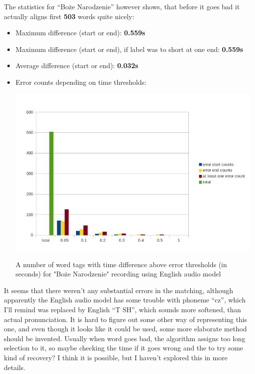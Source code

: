 \documentclass[12pt,a4paper,english]{article}
\begin{document}
The statistics for “Boże Narodzenie” however shows, that before it goes bad it actually aligns first \textbf{503} words quite nicely:
\begin{itemize}
    \item Maximum difference (start or end): 			\textbf{0.559s}
    \item Maximum difference (start or end), if label was to short at one end: 			\textbf{0.559s}
    \item Average difference  (start or end):			\textbf{0.032s}
    \item Error counts depending on time thresholds:
    \begin{center}
        \includegraphics[scale=0.55]{boze_narodzenie_word_english_results.jpg}
        \caption[]{A number of word tags with time difference above error thresholds (in seconds) for "Boże Narodzenie" recording using English audio model}
    \end{center}
\end{itemize}

It seems that there weren't any substantial errors in the matching, although apparently the English audio model has some trouble with phoneme “cz”, which I'll remind was replaced by English “T SH”, which sounds more softened, than actual pronunciation. It is hard to figure out some other way of representing this one, and even though it looks like it could be used, some more elaborate method should be invented. Usually when word goes bad, the algorithm assigns too long selection to it, so maybe checking the time if it goes wrong and the to try some kind of recovery? I think it is possible, but I haven't explored this in more details. \newline
\end{document}
